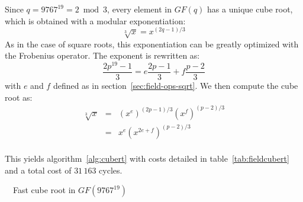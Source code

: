 \documentclass{llncs}
\newcommand{\GF}{GF}
\begin{document}
Since $q = 9767^{19} = 2 \bmod 3$, every element in $\GF(q)$ has
a unique cube root, which is obtained with a modular exponentiation:
\begin{equation*}
    \sqrt[3]{x} = x^{(2q-1)/3}
\end{equation*}
As in the case of square roots, this exponentiation can be greatly
optimized with the Frobenius operator. The exponent is rewritten as:
\begin{equation*}
    \frac{2p^{19}-1}{3} = e \frac{2p-1}{3} + f \frac{p-2}{3}
\end{equation*}
with $e$ and $f$ defined as in section~\ref{sec:field-ops-sqrt}. We
then compute the cube root as:
\begin{eqnarray*}
    \sqrt[3]{x} &=& (x^e)^{(2p-1)/3} (x^f)^{(p-2)/3} \\
                &=& x^e (x^{2e+f})^{(p-2)/3} \\
\end{eqnarray*}

This yields algorithm~\ref{alg:cubert} with costs detailed in
table~\ref{tab:fieldcubert} and a total cost of $31\,163$ cycles.

\begin{algorithm}[H]
    \caption{\ \ Fast cube root in $\GF(9767^{19})$}\label{alg:cubert}
    \begin{algorithmic}[1]
        \Require{$x \in \GF(p^n)$, $p = 9767$, $n = 19$}
    \end{algorithmic}
\end{algorithm}
\end{document}
